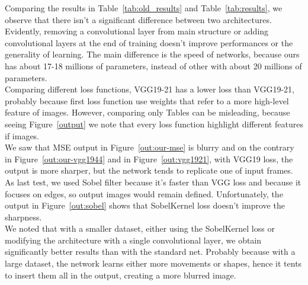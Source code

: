 \documentclass[11pt, a4paper]{article}
\begin{document}
	\vspace{0.5cm}
	Comparing the results in Table~\ref{tab:old_results} and Table~\ref{tab:results}, we observe that there isn't a significant difference between two architectures. Evidently, removing a convolutional layer from main structure or adding convolutional layers at the end of training doesn't improve performances or the generality of learning. The main difference is the speed of networks, because ours has about 17-18 millions of parameters, instead of other with about 20 millions of parameters.\\
	Comparing different loss functions, VGG19-21 has a lower loss than VGG19-21, probably because first loss function use weights that refer to a more high-level feature of images. However, comparing only Tables can be misleading, because seeing Figure~\ref{output} we note that every loss function highlight different features if images.\\ We saw that MSE output in Figure~\ref{out:our-mse} is blurry and on the contrary in Figure~\ref{out:our-vgg1944} and in Figure~\ref{out:vgg1921}, with VGG19 loss, the output is more sharper, but the network tends to replicate one of input frames.\\
	As last test, we used Sobel filter because it's faster than VGG loss and because it focuses on edges, so output images would remain defined. Unfortunately, the output in Figure~\ref{out:sobel} shows that SobelKernel loss doesn't improve the sharpness.\\
	We noted that with a smaller dataset, either using the SobelKernel loss or modifying the architecture with a single convolutional layer, we obtain significantly better results than with the standard net. Probably because with a large dataset, the network learns either more movements or shapes, hence it tents to insert them all in the output, creating a more blurred image.
	
\end{document}
